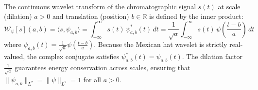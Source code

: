 \documentclass[11pt,twoside,openright]{book}
\begin{document}
The continuous wavelet transform of the chromatographic signal $s(t)$ at scale (dilation) $a > 0$ and translation (position) $b \in \mathbb{R}$ is defined by the inner product:
\begin{equation}
\label{eq:cwt_integral}
\mathcal{W}_\psi[s](a, b) = \langle s, \psi_{a, b} \rangle = \int_{-\infty}^{\infty} s(t) \, \psi_{a, b}^*(t) \, dt = \frac{1}{\sqrt{a}} \int_{-\infty}^{\infty} s(t) \, \psi\left( \frac{t - b}{a} \right) \, dt
\end{equation}
where $\psi_{a, b}(t) = \frac{1}{\sqrt{a}} \psi\left(\frac{t-b}{a}\right)$. Because the Mexican hat wavelet is strictly real-valued, the complex conjugate satisfies $\psi_{a, b}^*(t) = \psi_{a, b}(t)$. The dilation factor $\frac{1}{\sqrt{a}}$ guarantees energy conservation across scales, ensuring that $\|\psi_{a, b}\|_{L^2} = \|\psi\|_{L^2} = 1$ for all $a > 0$.
\end{document}
